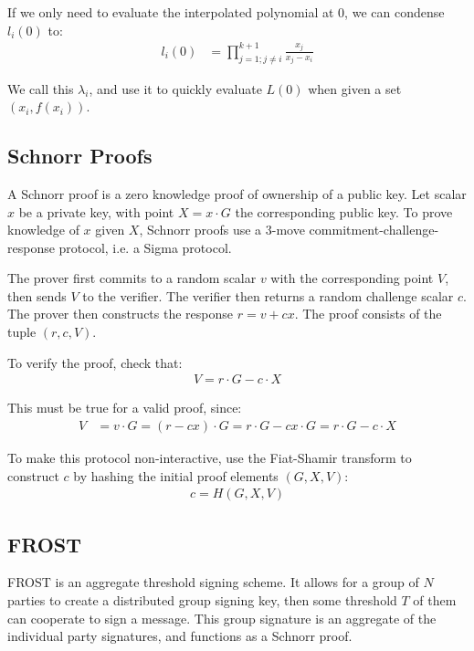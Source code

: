 \documentclass{article}
\begin{document}
If we only need to evaluate the interpolated polynomial at $0$, we can condense $l_i(0)$ to:
\begin{align}
  l_i(0) &= \prod_{j=1; j \neq i}^{k+1} \frac{x_j}{x_j - x_i}
\end{align}

We call this $\lambda_i$, and use it to quickly evaluate $L(0)$ when given a set $(x_i, f(x_i))$.

\newpage
\onecolumn

\subsection{
  Schnorr Proofs
}

A Schnorr proof \cite{schnorr} is a zero knowledge proof of ownership of a public key.  Let scalar $x$ be a private key, with point $X = x \cdot G$ the corresponding public key.  To prove knowledge of $x$ given $X$, Schnorr proofs use a $3$-move commitment-challenge-response protocol, i.e. a Sigma protocol.

The prover first commits to a random scalar $v$ with the corresponding point $V$, then sends $V$ to the verifier.  The verifier then returns a random challenge scalar $c$.  The prover then constructs the response $r = v + cx$.  The proof consists of the tuple $(r, c, V)$.

To verify the proof, check that:
\begin{align}
  V = r \cdot G - c \cdot X
\end{align}

This must be true for a valid proof, since:
\begin{align}
  V &= v \cdot G = (r - cx) \cdot G = r \cdot G - cx \cdot G = r \cdot G - c \cdot X\nonumber
\end{align}

To make this protocol non-interactive, use the Fiat-Shamir transform \cite{fiatshamir} to construct $c$ by hashing the initial proof elements $(G, X, V)$:
\begin{align}
  c = H(G, X, V)
\end{align}

\subsection{
  FROST
}

FROST is an aggregate threshold signing scheme.  It allows for a group of $N$ parties to create a distributed group signing key, then some threshold $T$ of them can cooperate to sign a message.  This group signature is an aggregate of the individual party signatures, and functions as a Schnorr proof.
\end{document}

